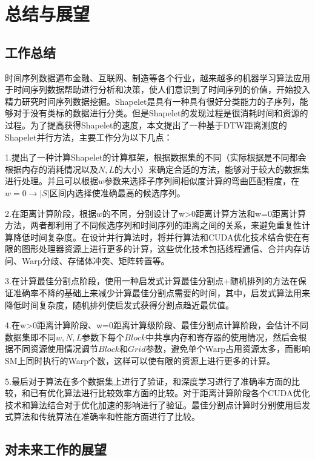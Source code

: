 \chapter{总结与展望}
\label{cha:summary}
\section{工作总结}

时间序列数据遍布金融、互联网、制造等各个行业，越来越多的机器学习算法应用于时间序列数据帮助进行分析和决策，使人们意识到了时间序列的价值，开始投入精力研究时间序列数据挖掘。Shapelet是具有一种具有很好分类能力的子序列，能够对于没有类标的数据进行分类。但是Shapelet的发现过程是很消耗时间和资源的过程。为了提高获得Shapelet的速度，本文提出了一种基于DTW距离测度的Shapelet并行方法，主要工作分为以下几点：

1.提出了一种计算Shapelet的计算框架，根据数据集的不同（实际根据是不同都会根据内存的消耗情况以及$N,L$的大小）来确定合适的方法，能够对于较大的数据集进行处理。并且可以根据$w$参数来选择子序列间相似度计算的弯曲匹配程度，在$w=0\to |S|$区间内选择使准确最高的候选序列。

2.在距离计算阶段，根据$w$的不同，分别设计了w>0距离计算方法和w=0距离计算方法，两者都利用了不同候选序列和时间序列的距离之间的关系，来避免重复性计算降低时间复杂度。在设计并行算法时，将并行算法和CUDA优化技术结合使在有限的图形处理器资源上进行更多的计算，这些优化技术包括线程通信、合并内存访问、Warp分歧、存储体冲突、矩阵转置等。

3.在计算最佳分割点阶段，使用一种启发式计算最佳分割点+随机排列的方法在保证准确率不降的基础上来减少计算最佳分割点需要的时间，其中，启发式算法用来降低时间复杂度，随机排列使启发式获得分割点趋近最优值。

4.在w>0距离计算阶段、w=0距离计算级阶段、最佳分割点计算阶段，会估计不同数据集即不同$w,N,L$参数下每个$Block$中共享内存和寄存器的使用情况，然后会根据不同资源使用情况调节$Block$和$Grid$参数，避免单个Warp占用资源太多，而影响SM上同时执行的Warp个数，这样可以使有限的资源上进行更多的计算。

5.最后对于算法在多个数据集上进行了验证，和深度学习进行了准确率方面的比较，和已有优化算法进行比较效率方面的比较。对于距离计算阶段各个CUDA优化技术和算法结合对于优化加速的影响进行了验证。最佳分割点计算时分别使用启发式算法和传统算法在准确率和性能方面进行了比较。


\section{对未来工作的展望}

